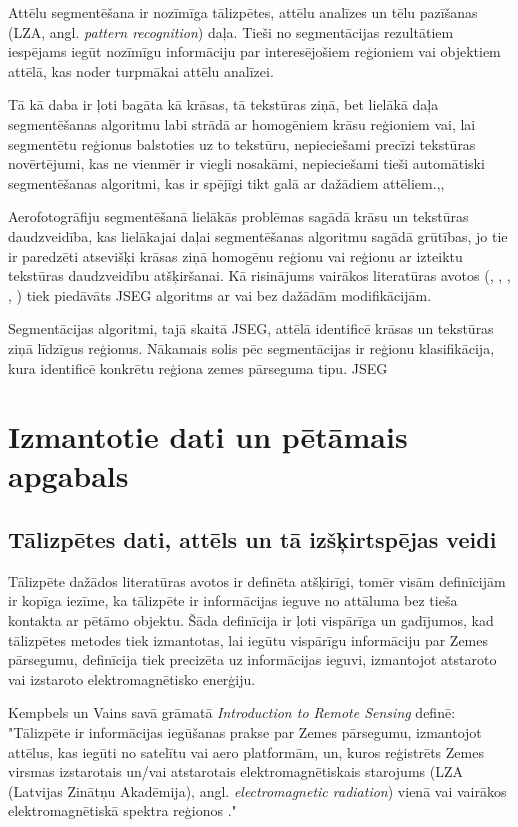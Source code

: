 \documentclass[12pt,paper=a4]{report}
\begin{document}
Attēlu segmentēšana ir nozīmīga tālizpētes, attēlu analīzes un tēlu pazīšanas (LZA, angl. \textit{pattern recognition}) daļa. Tieši no segmentācijas rezultātiem iespējams iegūt nozīmīgu informāciju par interesējošiem reģioniem vai objektiem attēlā, kas noder turpmākai attēlu analīzei.\cite{4satImSegm2012} \par 
Tā kā daba ir ļoti bagāta kā krāsas, tā tekstūras ziņā, bet lielākā daļa segmentēšanas algoritmu labi strādā ar homogēniem krāsu reģioniem vai, lai segmentētu reģionus balstoties uz to tekstūru, nepieciešami precīzi tekstūras novērtējumi, kas ne vienmēr ir viegli nosakāmi, nepieciešami tieši automātiski segmentēšanas algoritmi, kas ir spējīgi tikt galā ar dažādiem attēliem.\cite{4satImSegm2012},\cite{1colImSegm1999},\cite{2unsupImSegm2001} \par
Aerofotogrāfiju segmentēšanā lielākās problēmas sagādā krāsu un tekstūras daudzveidība, kas lielākajai daļai segmentēšanas algoritmu sagādā grūtības, jo tie ir paredzēti atsevišķi krāsas ziņā homogēnu reģionu vai reģionu ar izteiktu tekstūras daudzveidību atšķiršanai. Kā risinājums vairākos literatūras avotos (\cite{4satImSegm2012}, \cite{1colImSegm1999}, \cite{2unsupImSegm2001}, \cite{6buildings2008}, \cite{5forest2007}) tiek piedāvāts JSEG algoritms ar vai bez dažādām modifikācijām. \par
Segmentācijas algoritmi, tajā skaitā JSEG, attēlā identificē krāsas un tekstūras ziņā līdzīgus reģionus. Nākamais solis pēc segmentācijas ir reģionu klasifikācija, kura identificē konkrētu reģiona zemes pārseguma tipu. JSEG \par

\chapter{Izmantotie dati un pētāmais apgabals}
\section{Tālizpētes dati, attēls un tā izšķirtspējas veidi}Tālizpēte dažādos literatūras avotos ir definēta atšķirīgi, tomēr visām definīcijām ir kopīga iezīme, ka tālizpēte ir informācijas ieguve no attāluma bez tieša kontakta ar pētāmo objektu. Šāda definīcija ir ļoti vispārīga un gadījumos, kad tālizpētes metodes tiek izmantotas, lai iegūtu vispārīgu informāciju par Zemes pārsegumu, definīcija tiek precizēta uz informācijas ieguvi, izmantojot atstaroto vai izstaroto elektromagnētisko enerģiju.\par
Kempbels un Vains savā grāmatā \textit{Introduction to Remote Sensing} definē: "Tālizpēte ir informācijas iegūšanas prakse par Zemes pārsegumu, izmantojot attēlus, kas iegūti no satelītu vai aero platformām, un, kuros reģistrēts Zemes virsmas izstarotais un/vai atstarotais elektromagnētiskais starojums (LZA (Latvijas Zinātņu Akadēmija), angl. \textit{electromagnetic radiation}) vienā vai vairākos elektromagnētiskā spektra reģionos \cite{IntrToRemSensing}."\par
\end{document}
